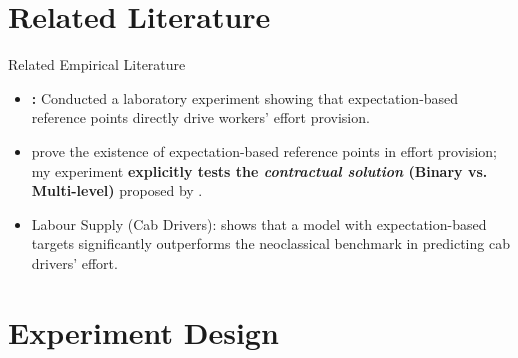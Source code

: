 \documentclass{beamer}
\begin{document}
\section{Related Literature}

\begin{frame}{Related Empirical Literature}

    \begin{itemize}
        \item \textbf{\textcite{Abeler2011}:} Conducted a laboratory experiment showing that expectation-based reference points directly drive workers' effort provision. 
        \item \textcite{Abeler2011} prove the existence of expectation-based reference points in effort provision; my experiment \textbf{explicitly tests the \textit{contractual solution} (Binary vs. Multi-level)} proposed by \textcite{Herweg2010}.

        \medskip
        
        \item Labour Supply (Cab Drivers): \textbf{\textcite{Crawford2011}} shows that a model with expectation-based targets significantly outperforms the neoclassical benchmark in predicting cab drivers' effort.
    \end{itemize}

\end{frame}


\section{Experiment Design}
\end{document}
